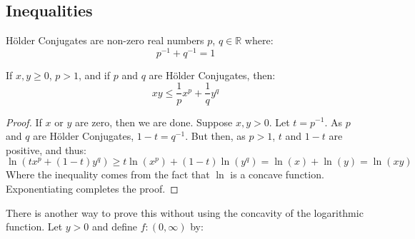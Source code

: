 \documentclass[crop=false,class=book,oneside]{standalone}
\begin{document}
        \subsection{Inequalities}
            \begin{definition}
                H\"{o}lder Conjugates are non-zero real numbers
                $p$, $q\in\mathbb{R}$ where:
                \begin{equation}
                    p^{-1}+q^{-1}=1
                \end{equation}
            \end{definition}
            \begin{theorem}
                If $x,y\geq{0}$, $p>1$, and if $p$ and $q$
                are H\"{o}lder Conjugates, then:
                \begin{equation}
                    xy\leq{\frac{1}{p}x^{p}+\frac{1}{q}y^{q}}
                \end{equation}
            \end{theorem}
            \begin{proof}
                If $x$ or $y$ are zero, then we are done.
                Suppose $x,y>0$. Let $t=p^{-1}$. As $p$ and
                $q$ are H\"{o}lder Conjugates,
                $1-t=q^{-1}$. But then, as $p>1$,
                $t$ and $1-t$ are positive, and thus:
                \begin{equation}
                    \ln(tx^{p}+(1-t)y^{q})
                    \geq{t}\ln(x^{p})+(1-t)\ln(y^{q})
                    =\ln(x)+\ln(y)=\ln(xy)
                \end{equation}
                Where the inequality comes from the fact
                that $\ln$ is a concave function.
                Exponentiating completes the proof.
            \end{proof}
            There is another way to prove this without using
            the concavity of the logarithmic function.
            Let $y>0$ and define $f:(0,\infty)$ by:
\end{document}
